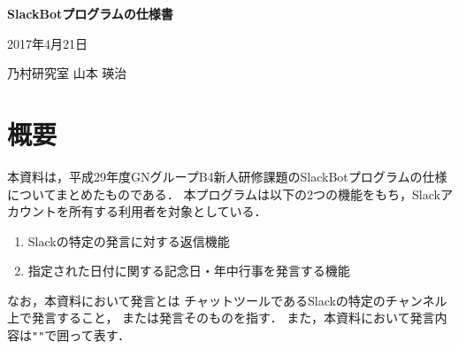 \documentclass[fleqn, 14pt]{extarticlej}
\begin{document}
\begin{center}
  {\Large {\bf SlackBotプログラムの仕様書}}

\end{center}
\begin{flushright}
  2017年4月21日

  乃村研究室 山本 瑛治
\end{flushright}


\section{概要}
本資料は，平成29年度GNグループB4新人研修課題のSlackBotプログラムの仕様
についてまとめたものである．
本プログラムは以下の2つの機能をもち，Slack\cite{Slack}アカウントを所有する利用者を対象としている．
\begin{enumerate}
\item Slackの特定の発言に対する返信機能
\item 指定された日付に関する記念日・年中行事を発言する機能
\end{enumerate}
なお，本資料において発言とは
チャットツールであるSlackの特定のチャンネル上で発言すること，
または発言そのものを指す．
また，本資料において発言内容は\verb|"|\verb|"|で囲って表す．



\end{document}
